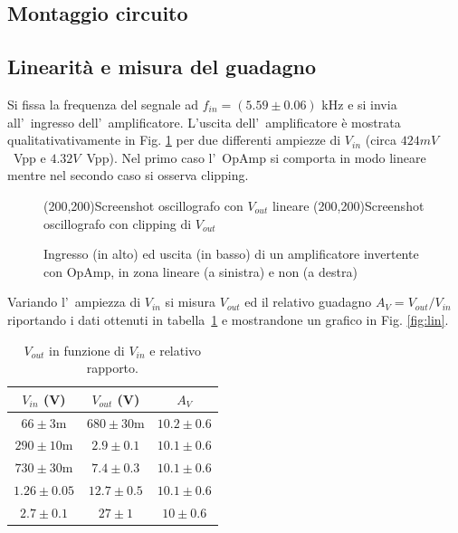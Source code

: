 \documentclass[10pt,a4paper]{article}
\begin{document}
\subsection{Montaggio circuito}

\subsection{Linearit\`a e misura del guadagno}
Si fissa la frequenza del segnale ad $f_{in} = (5.59 \pm 0.06)$ kHz e si invia all'~ingresso dell'~amplificatore.
L'uscita dell'~amplificatore \`e mostrata qualitativativamente in Fig. \ref{fig:oscinv} per due 
differenti ampiezze di $V_{in}$ (circa $424mV$~Vpp e $4.32V$~Vpp). 
Nel primo caso l'~OpAmp si comporta in modo lineare mentre nel secondo caso si osserva clipping.   
%
\begin{figure}[h]
\begin{center}
\framebox(200,200){Screenshot oscillografo con $V_{out}$ lineare}
\framebox(200,200){Screenshot oscillografo con clipping di $V_{out}$}
\end{center}
\caption{\small Ingresso (in alto) ed uscita (in basso) di un amplificatore invertente con OpAmp, in 
zona lineare (a sinistra) e non (a destra)}
\label{fig:oscinv}
\end{figure}
%

Variando l'~ampiezza di $V_{in}$ si misura $V_{out}$ ed il relativo guadagno $A_V=V_{out}/V_{in}$ riportando i dati ottenuti in tabella~\ref{tab:guadagno} 
e mostrandone un grafico in Fig. \ref{fig:lin}. 

\begin{table}[h]
\caption{$V_{out}$ in funzione di $V_{in}$ e relativo rapporto.}
\label{tab:guadagno}
\begin{center}
\begin{tabular}{|c|c|c|}
\hline
$V_{in}$ (V) & $V_{out}$ (V)  & $A_V$ \\
\hline
\hline
$66 \pm 3\mathrm{m} $ & $680 \pm 30\mathrm{m} $ & $10.2 \pm 0.6 $ \\
\hline
$290 \pm 10\mathrm{m} $ & $2.9 \pm 0.1 $ & $10.1 \pm 0.6 $ \\
\hline
$730 \pm 30\mathrm{m} $ & $7.4 \pm 0.3 $ & $10.1 \pm 0.6 $ \\
\hline
$1.26 \pm 0.05 $ & $12.7 \pm 0.5 $ & $10.1 \pm 0.6 $ \\
\hline
$2.7 \pm 0.1 $ & $27 \pm 1 $ & $10 \pm 0.6 $ \\
\hline
\end{tabular}
\end{center}
\end{table}
\end{document}
